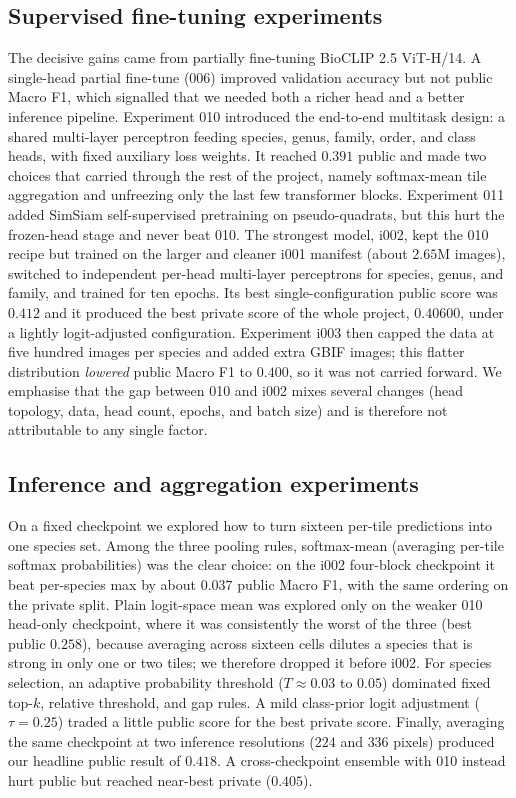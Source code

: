 \subsection{Supervised fine-tuning experiments}
The decisive gains came from partially fine-tuning BioCLIP 2.5 ViT-H/14. A
single-head partial fine-tune (006) improved validation accuracy but not public
Macro F1, which signalled that we needed both a richer head and a better inference
pipeline. Experiment 010 introduced the end-to-end multitask design: a shared
multi-layer perceptron feeding species, genus, family, order, and class heads, with
fixed auxiliary loss weights. It reached $0.391$ public and made two choices that
carried through the rest of the project, namely softmax-mean tile aggregation and
unfreezing only the last few transformer blocks. Experiment 011 added SimSiam
self-supervised pretraining on pseudo-quadrats, but this hurt the frozen-head stage
and never beat 010. The strongest model, i002, kept the 010 recipe but trained on the
larger and cleaner i001 manifest (about $2.65$M images), switched to independent
per-head multi-layer perceptrons for species, genus, and family, and trained for ten
epochs. Its best single-configuration public score was $0.412$ and it produced the
best private score of the whole project, $0.40600$, under a lightly logit-adjusted
configuration. Experiment i003 then capped the data at five hundred images per
species and added extra GBIF images; this flatter distribution \emph{lowered} public
Macro F1 to $0.400$, so it was not carried forward. We emphasise that the gap between
010 and i002 mixes several changes (head topology, data, head count, epochs, and batch
size) and is therefore not attributable to any single factor.

\subsection{Inference and aggregation experiments}
On a fixed checkpoint we explored how to turn sixteen per-tile predictions into one
species set. Among the three pooling rules, softmax-mean (averaging per-tile softmax
probabilities) was the clear choice: on the i002 four-block checkpoint it beat
per-species max by about $0.037$ public Macro F1, with the same ordering on the
private split. Plain logit-space mean was explored only on the weaker 010 head-only
checkpoint, where it was consistently the worst of the three (best public $0.258$),
because averaging across sixteen cells dilutes a species that is strong in only one or
two tiles; we therefore dropped it before i002. For species selection, an adaptive
probability threshold ($T \approx 0.03$ to $0.05$) dominated fixed top-$k$, relative
threshold, and gap rules. A mild class-prior logit adjustment ($\tau{=}0.25$) traded a
little public score for the best private score. Finally, averaging the same checkpoint
at two inference resolutions ($224$ and $336$ pixels) produced our headline public
result of $0.418$. A cross-checkpoint ensemble with 010 instead hurt public but
reached near-best private ($0.405$).

